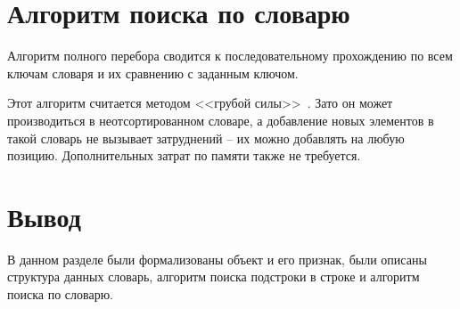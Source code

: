 \section{Алгоритм поиска по словарю}

Алгоритм полного перебора сводится к последовательному прохождению по всем ключам словаря и их сравнению с заданным ключом. 

Этот алгоритм считается методом <<грубой силы>>~\cite{kekw}. Зато он может производиться в неотсортированном словаре, а добавление новых элементов в такой словарь не вызывает затруднений -- их можно добавлять на любую позицию. Дополнительных затрат по памяти также не требуется.

\section*{Вывод}

В данном разделе были формализованы объект и его признак, были описаны структура данных словарь, алгоритм поиска подстроки в строке и алгоритм поиска по словарю.
